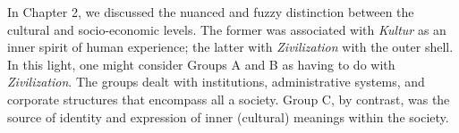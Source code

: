 In Chapter 2, we discussed the nuanced and fuzzy distinction between the cultural and socio-economic levels. The former was associated with \textit{Kultur} as an inner spirit of human experience; the latter with \textit{Zivilization} with the outer shell. In this light, one might consider Groups A and B as having to do with \textit{Zivilization}. The groups dealt with institutions, administrative systems, and corporate structures that encompass all a society. Group C, by contrast, was the source of identity and expression of inner (cultural) meanings within the society.    